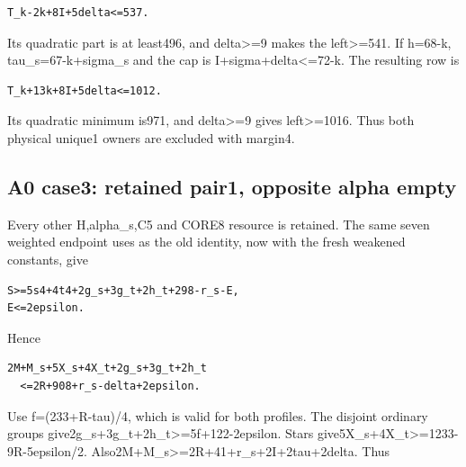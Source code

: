 \documentclass[10pt,a4paper]{article}
\theoremstyle{definition}
\begin{document}
\begin{lstlisting}
T_k-2k+8I+5delta<=537.
\end{lstlisting}

Its quadratic part is at least496,\allowbreak{} and delta\textgreater=\allowbreak{}9 makes the
left\textgreater=\allowbreak{}541. If h=\allowbreak{}68-k,\allowbreak{} tau\_\allowbreak{}s=\allowbreak{}67-k+\allowbreak{}sigma\_\allowbreak{}s and the cap is
I+\allowbreak{}sigma\textquotesingle+\allowbreak{}delta\textless=\allowbreak{}72-k. The resulting row is

\begin{lstlisting}
T_k+13k+8I+5delta<=1012.
\end{lstlisting}

Its quadratic minimum is971,\allowbreak{} and delta\textgreater=\allowbreak{}9 gives
left\textgreater=\allowbreak{}1016. Thus both physical unique1 owners are excluded
with margin4.

\hypertarget{a0-case3-retained-pair1-opposite-alpha-empty}{%
\subsection{A0 case3: retained pair1,\allowbreak{} opposite alpha
empty}\label{a0-case3-retained-pair1-opposite-alpha-empty}}

Every other H,\allowbreak{}alpha\_\allowbreak{}s,\allowbreak{}C5 and CORE8 resource is retained. The same seven
weighted endpoint uses as the old identity,\allowbreak{} now with the fresh weakened
constants,\allowbreak{} give

\begin{lstlisting}
S>=5s4+4t4+2g_s+3g_t+2h_t+298-r_s-E,
E<=2epsilon.
\end{lstlisting}

Hence

\begin{lstlisting}
2M+M_s+5X_s+4X_t+2g_s+3g_t+2h_t
  <=2R+908+r_s-delta+2epsilon.
\end{lstlisting}

Use f=\allowbreak{}(233+\allowbreak{}R-tau)/4,\allowbreak{} which is valid for both profiles. The disjoint
ordinary groups give2g\_\allowbreak{}s+\allowbreak{}3g\_\allowbreak{}t+\allowbreak{}2h\_\allowbreak{}t\textgreater=\allowbreak{}5f+\allowbreak{}122-2epsilon. Stars
give5X\_\allowbreak{}s+\allowbreak{}4X\_\allowbreak{}t\textgreater=\allowbreak{}1233-9R-5epsilon/2.
Also2M+\allowbreak{}M\_\allowbreak{}s\textgreater=\allowbreak{}2R+\allowbreak{}41+\allowbreak{}r\_\allowbreak{}s+\allowbreak{}2I+\allowbreak{}2tau+\allowbreak{}2delta. Thus
\end{document}

